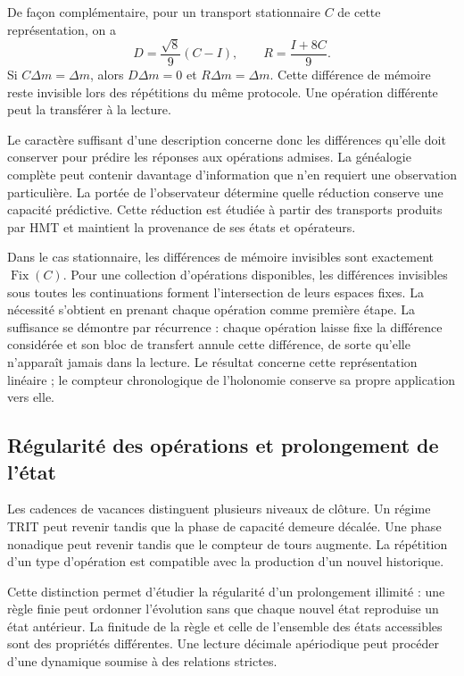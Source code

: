 De façon complémentaire, pour un transport stationnaire $C$ de cette représentation, on a
\begin{equation}
 D=\frac{\sqrt8}{9}(C-I),\qquad R=\frac{I+8C}{9}.
 \label{md:lectin:bloques-memoria}
\end{equation}
Si $C\Delta m=\Delta m$, alors $D\Delta m=0$ et $R\Delta m=\Delta m$. Cette différence de mémoire reste invisible lors des répétitions du même protocole. Une opération différente peut la transférer à la lecture.

Le caractère suffisant d'une description concerne donc les différences qu'elle doit conserver pour prédire les réponses aux opérations admises. La généalogie complète peut contenir davantage d'information que n'en requiert une observation particulière. La portée de l'observateur détermine quelle réduction conserve une capacité prédictive. Cette réduction est étudiée à partir des transports produits par HMT et maintient la provenance de ses états et opérateurs.

Dans le cas stationnaire, les différences de mémoire invisibles sont exactement $\operatorname{Fix}(C)$. Pour une collection d'opérations disponibles, les différences invisibles sous toutes les continuations forment l'intersection de leurs espaces fixes. La nécessité s'obtient en prenant chaque opération comme première étape. La suffisance se démontre par récurrence : chaque opération laisse fixe la différence considérée et son bloc de transfert annule cette différence, de sorte qu'elle n'apparaît jamais dans la lecture. Le résultat concerne cette représentation linéaire ; le compteur chronologique de l'holonomie conserve sa propre application vers elle.

\subsection{Régularité des opérations et prolongement de l'état}
\label{md:lectin:regularidad}

Les cadences de vacances distinguent plusieurs niveaux de clôture. Un régime TRIT peut revenir tandis que la phase de capacité demeure décalée. Une phase nonadique peut revenir tandis que le compteur de tours augmente. La répétition d'un type d'opération est compatible avec la production d'un nouvel historique.

Cette distinction permet d'étudier la régularité d'un prolongement illimité : une règle finie peut ordonner l'évolution sans que chaque nouvel état reproduise un état antérieur. La finitude de la règle et celle de l'ensemble des états accessibles sont des propriétés différentes. Une lecture décimale apériodique peut procéder d'une dynamique soumise à des relations strictes.

